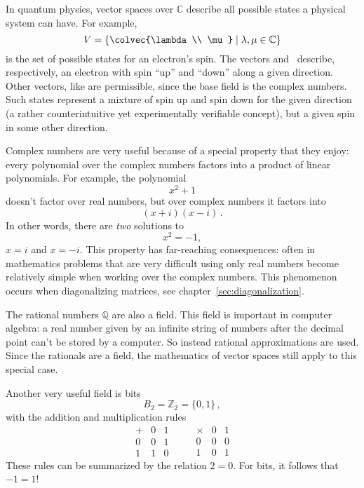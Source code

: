 \begin{example}
In quantum physics, vector spaces over $\mathbb{C}$ describe all possible states a physical system %
can have.  
For example,
\[
V= \left\{ \colvec{\lambda \\ \mu} \mid \lambda, \mu \in \mathbb{C}\right\}
\]
is the set of possible states for an electron's spin. The vectors   and~ describe, respectively,  an  electron with spin ``up'' and ``down'' along a given direction.  
Other vectors, like  are permissible, since the base field is the complex numbers. Such states represent a mixture of spin up and spin down for the given direction (a rather counterintuitive yet experimentally verifiable concept), but a given spin in some other direction.
\end{example}

Complex numbers are very useful because of a special property that they enjoy: every polynomial over the complex numbers factors into a product of linear polynomials.  For example, the polynomial \[x^2+1\] doesn't factor over  real numbers, but over complex numbers it factors into \[(x+i)(x-i)\, .\] In other words, there are {\it two} solutions to \[x^2=-1,\]
$x=i$ and $x=-i$.
 This property  has far-reaching consequences: often in mathematics problems that are very difficult using only real numbers become relatively simple when working over the complex numbers.  This phenomenon occurs when diagonalizing matrices, see chapter~\ref{sec:diagonalization}.

The rational numbers $\mathbb{Q}$ are also a field. This  field is important in computer algebra: a real number given by an infinite string of numbers after the decimal point can't be stored by a computer.  So instead rational approximations are used.  Since the rationals are a field, the mathematics of vector spaces still apply to this special case.

Another very useful field is bits 
\[
B_2={\mathbb Z}_2=\{0,1\}\, ,
\]
with the addition and multiplication rules
\[
\begin{array}{c|cc}
+&0&1\\\hline
0&0&1\\
1&1&0
\end{array}\qquad
\begin{array}{c|cc}
\times&0&1\\\hline
0&0&0\\
1&0&1
\end{array}
\]
These rules can be summarized by the relation $2=0$. For bits, it follows that $-1=1$!

